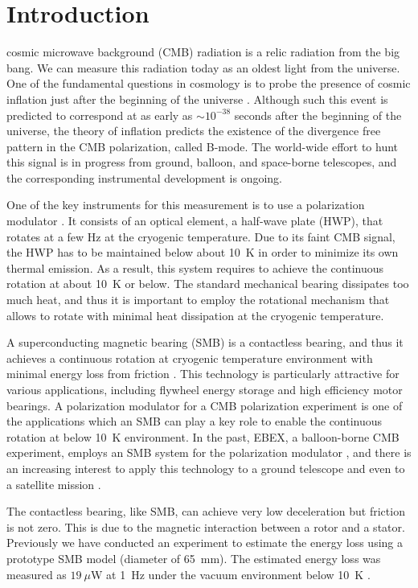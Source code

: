 \documentclass[iournal]{IEEEtran}
\begin{document}
\section{Introduction}
 cosmic microwave background (CMB) radiation is a relic radiation from the big bang.
We can measure this radiation today as an oldest light from the universe.
One of the fundamental questions in cosmology is to probe the presence of cosmic inflation just after the beginning of the universe \cite{inflation_sato,inflation_guth}.
Although such this event is predicted to correspond at as early as $\sim10^{-38}$ seconds after the beginning of the universe, the theory of inflation predicts the existence of the divergence free pattern in the CMB polarization, called B-mode.
The world-wide effort to hunt this signal is in progress from ground, balloon, and space-borne telescopes, and the corresponding instrumental development is ongoing.

One of the key instruments for this measurement is to use a polarization modulator \cite{abs,pb2,spider,shaul}.
It consists of an optical element, a half-wave plate (HWP), that rotates at a few Hz at the cryogenic temperature.
Due to its faint CMB signal, the HWP has to be maintained below about 10~K in order to minimize its own thermal emission.
As a result, this system requires to achieve the continuous rotation at about 10~K or below.
The standard mechanical bearing dissipates too much heat, and thus it is important to employ the rotational mechanism that allows to rotate with minimal heat dissipation at the cryogenic temperature.

A superconducting magnetic bearing (SMB) is a contactless bearing, and thus it achieves a continuous rotation at cryogenic temperature environment with minimal energy loss from friction \cite{hull_review}.
This technology is particularly attractive for various applications, including flywheel energy storage and high efficiency motor bearings.
A polarization modulator for a CMB polarization experiment is one of the applications which an SMB can play a key role to enable the continuous rotation at below 10~K environment.
In the past, EBEX, a balloon-borne CMB experiment, employs an SMB system for the polarization modulator \cite{jklein}, and there is an increasing interest to apply this technology to a ground telescope and even to a satellite mission \cite{litebird}.

The contactless bearing, like SMB, can achieve very low deceleration but friction is not zero.
This is due to the magnetic interaction between a rotor and a stator.
Previously we have conducted an experiment to estimate the energy loss using a prototype SMB model (diameter of 65~mm).
The estimated energy loss was measured as $19~\mu$W at 1~Hz under the vacuum environment below 10~K \cite{matsumura_eucas2015}.
\end{document}
